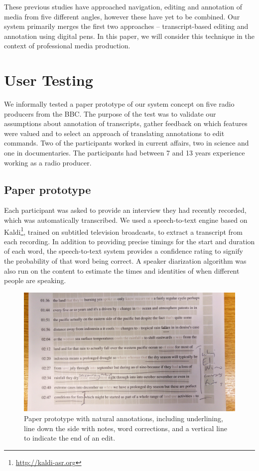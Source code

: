 These previous studies have approached navigation, editing and annotation of
media from five different angles, however these have yet to be combined.
Our system primarily merges the first two approaches -- transcript-based editing
and annotation using digital pens. In this paper, we will consider this
technique in the context of professional media production.

\section{User Testing}
We informally tested a paper prototype of our system concept on five radio
producers from the BBC. The purpose of the test was to validate our assumptions
about annotation of transcripts, gather feedback on which features were valued
and to select an approach of translating annotations to edit commands.
Two of the participants worked in current affairs, two in science and one in
documentaries. The participants had between 7 and 13 years experience working as
a radio producer.

\subsection{Paper prototype}
Each participant was asked to provide an interview they had recently recorded,
which was automatically transcribed.  We used a speech-to-text engine based on
Kaldi\footnote{\url{http://kaldi-asr.org}}, trained on subtitled television
broadcasts, to extract a transcript from each recording. In addition to
providing precise timings for the start and duration of each word, the
speech-to-text system provides a confidence rating to signify the probability
of that word being correct. A speaker diarization \cite{AngueraMiro2012}
algorithm was also run on the content to estimate the times and
identities of when different people are speaking.

\begin{figure}[h]
  \centering
  \includegraphics[width=\columnwidth]{figs/mockup}
  \caption{Paper prototype with natural annotations, including
    underlining, line down the side with notes, word corrections, and a
    vertical line to indicate the end of an edit.}
  \label{fig:natural}
\end{figure}

